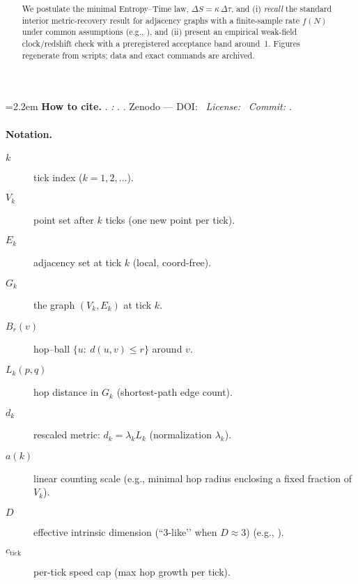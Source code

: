 \documentclass[11pt,a4paper]{article}
\title{\PaperTitleMain\\[2pt]
\large \texorpdfstring{\PaperSubtitleMath}{Delta S = k Delta tau}}
\author{\AuthorName}
\date{\PaperVersion}
\begin{document}
\maketitle

\noindent\begingroup
\setlength{\emergencystretch}{12em}\sloppy\raggedright
\hangindent=2.2em 
\textbf{How to cite.}\enspace
\AuthorNameShort. \emph{\PaperTitleMain:} \texorpdfstring{\PaperSubtitleMath}{Delta S = k Delta tau}. \PaperVersion.
Zenodo — DOI: \RepoDOIlink \textbullet\ \textit{License:} \PaperLicense \textbullet\ \textit{Commit:} \RepoCommit.%
\par\endgroup

\begin{abstract}
We postulate the minimal Entropy--Time law, $\Delta S=\kappa\,\Delta\tau$, and (i) \emph{recall} the standard interior metric-recovery result for adjacency graphs with a finite-sample rate $f(N)$ under common assumptions (e.g., \cite{Tenenbaum2000,lovasz1993random}), and (ii) present an empirical weak-field clock/redshift check with a preregistered acceptance band around~1. Figures regenerate from scripts; data and exact commands are archived.
\end{abstract}

\paragraph{Notation.}
\begin{description}
  \item[$k$] tick index ($k=1,2,\dots$).
  \item[$V_k$] point set after $k$ ticks (one new point per tick).
  \item[$E_k$] adjacency set at tick $k$ (local, coord-free).
  \item[$G_k$] the graph $(V_k,E_k)$ at tick $k$.
  \item[$B_r(v)$] hop–ball $\{u:\ d(u,v)\le r\}$ around $v$.
  \item[$L_k(p,q)$] hop distance in $G_k$ (shortest-path edge count).
  \item[$d_k$] rescaled metric: $d_k=\lambda_k L_k$ (normalization $\lambda_k$).
  \item[$a(k)$] linear counting scale (e.g., minimal hop radius enclosing a fixed fraction of $V_k$).
  \item[$D$] effective intrinsic dimension (“3-like’’ when $D\approx 3$) (e.g., \cite{falconer2014fractal,grassberger1983measuring}).
  \item[$c_{\text{tick}}$] per-tick speed cap (max hop growth per tick).
\end{description}
\end{document}
